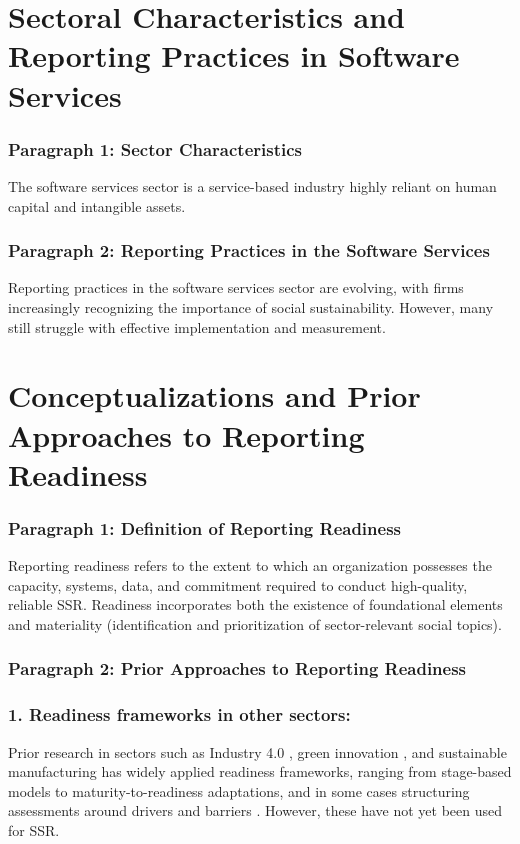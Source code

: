 \section{Sectoral Characteristics and Reporting Practices in Software Services}

\subsubsection{Paragraph 1: Sector Characteristics}
The software services sector is a service-based industry highly reliant on human capital and intangible assets.

\subsubsection{Paragraph 2: Reporting Practices in the Software Services}
Reporting practices in the software services sector are evolving, with firms increasingly recognizing 
the importance of social sustainability. However, many still struggle with effective implementation and measurement.

\section{Conceptualizations and Prior Approaches to Reporting Readiness}

\subsubsection{Paragraph 1: Definition of Reporting Readiness}
Reporting readiness refers to the extent to which an organization possesses the capacity, systems, data,
and commitment required to conduct high-quality, reliable SSR. Readiness incorporates both 
the existence of foundational elements and materiality (identification and prioritization of sector-relevant social topics).

\subsubsection{Paragraph 2: Prior Approaches to Reporting Readiness}

\subsubsection{1. Readiness frameworks in other sectors:}
Prior research in sectors such as Industry 4.0 \parencite{ElBaz2022}, 
green innovation \parencite{Zhang2020},
and sustainable manufacturing \parencite{Barletta2021} has widely applied readiness frameworks,
ranging from stage-based models to maturity-to-readiness adaptations, 
and in some cases structuring assessments around drivers and barriers \parencite{Govindan2023}.
However, these have not yet been used for SSR.


